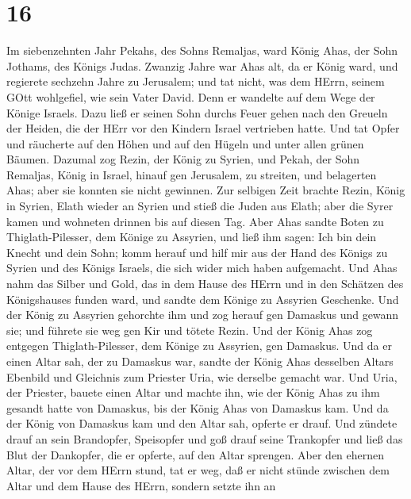 \hypertarget{section-15}{%
\section{16}\label{section-15}}

 Im siebenzehnten Jahr Pekahs, des Sohns Remaljas, ward
König Ahas, der Sohn Jothams, des Königs Judas.  Zwanzig
Jahre war Ahas alt, da er König ward, und regierete sechzehn Jahre zu
Jerusalem; und tat nicht, was dem HErrn, seinem GOtt wohlgefiel, wie
sein Vater David.  Denn er wandelte auf dem Wege der Könige
Israels. Dazu ließ er seinen Sohn durchs Feuer gehen nach den Greueln
der Heiden, die der HErr vor den Kindern Israel vertrieben hatte.
 Und tat Opfer und räucherte auf den Höhen und auf den
Hügeln und unter allen grünen Bäumen.  Dazumal zog Rezin,
der König zu Syrien, und Pekah, der Sohn Remaljas, König in Israel,
hinauf gen Jerusalem, zu streiten, und belagerten Ahas; aber sie konnten
sie nicht gewinnen.  Zur selbigen Zeit brachte Rezin, König
in Syrien, Elath wieder an Syrien und stieß die Juden aus Elath; aber
die Syrer kamen und wohneten drinnen bis auf diesen Tag. 
Aber Ahas sandte Boten zu Thiglath-Pilesser, dem Könige zu Assyrien, und
ließ ihm sagen: Ich bin dein Knecht und dein Sohn; komm herauf und hilf
mir aus der Hand des Königs zu Syrien und des Königs Israels, die sich
wider mich haben aufgemacht.  Und Ahas nahm das Silber und
Gold, das in dem Hause des HErrn und in den Schätzen des Königshauses
funden ward, und sandte dem Könige zu Assyrien Geschenke. 
Und der König zu Assyrien gehorchte ihm und zog herauf gen Damaskus und
gewann sie; und führete sie weg gen Kir und tötete Rezin. 
Und der König Ahas zog entgegen Thiglath-Pilesser, dem Könige zu
Assyrien, gen Damaskus. Und da er einen Altar sah, der zu Damaskus war,
sandte der König Ahas desselben Altars Ebenbild und Gleichnis zum
Priester Uria, wie derselbe gemacht war.  Und Uria, der
Priester, bauete einen Altar und machte ihn, wie der König Ahas zu ihm
gesandt hatte von Damaskus, bis der König Ahas von Damaskus kam.
 Und da der König von Damaskus kam und den Altar sah,
opferte er drauf.  Und zündete drauf an sein Brandopfer,
Speisopfer und goß drauf seine Trankopfer und ließ das Blut der
Dankopfer, die er opferte, auf den Altar sprengen.  Aber
den ehernen Altar, der vor dem HErrn stund, tat er weg, daß er nicht
stünde zwischen dem Altar und dem Hause des HErrn, sondern setzte ihn an
